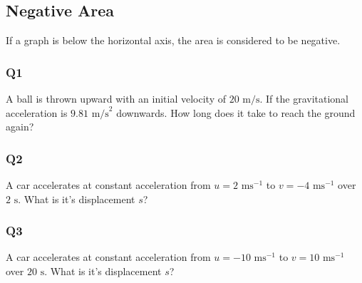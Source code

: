 \documentclass{article}
\begin{document}
\subsection{Negative Area}
If a graph is below the horizontal axis, the area is considered to be negative. 
\subsubsection{Q1}
A ball is thrown upward with an initial velocity of $20\text{ m/s}$. If the gravitational acceleration is $9.81\text{ m/s}^2$ downwards. How long does it take to reach the ground again? 
\subsubsection{Q2}
A car accelerates at constant acceleration from $u=2\text{ ms}^{-1}$ to $v=-4\text{ ms}^{-1}$ over $2\text{ s}$. What is it's displacement $s$?
\subsubsection{Q3}
A car accelerates at constant acceleration from $u=-10\text{ ms}^{-1}$ to $v=10\text{ ms}^{-1}$ over $20\text{ s}$. What is it's displacement $s$?
\end{document}
